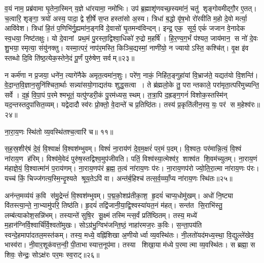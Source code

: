 व॒यं नाम॒ प्रब्र॑वामा घृ॒तेना॒स्मिन् य॒ज्ञे धा॑रयामा॒ नमो॑भिः। उप॑ ब्र॒ह्माशृ॑णवच्छ॒स्यमा॑नं॒ चतु॑ शृङ्गोवमीद्गौ॒र ए॒तत्। च॒त्वारि॒ शृङ्गा॒ त्रयो॑ अस्य॒ पादा॒ द्वे शी॒र्\mbox{}षे स॒प्त हस्ता॑सो अ॒स्य। त्रिधा॑ ब॒द्धो वृ॑ष॒भो रो॑रवीति म॒हो दे॒वो मर्त्या॒ आवि॑वेश। त्रिधा॑ हि॒तं प॒णिभि॑र्गु॒ह्यमा॑न॒ङ्गवि॑ दे॒वासो॑ घृ॒तमन्व॑विन्दन्। इन्द्र॒ एक॒ सूर्य॒ एकं॑ जजान वे॒नादेक स्व॒धया॒ निष्ट॑तक्षुः। यो दे॒वानां प्रथ॒मं पु॒रस्ता॒द्विश्वा॒धिको॑ रु॒द्रो म॒हर्\mbox{}षि॑। हि॒र॒ण्य॒ग॒र्भं प॑श्यत॒ जाय॑मान॒ स नो॑ दे॒वः  शु॒भया॒ स्मृत्या॒ संयु॑नक्तु। यस्मा॒त्परं॒ नाप॑र॒मस्ति॒ किञ्चि॒द्यस्मां॒ नाणी॑यो॒ न ज्यायोऽस्ति॒ कश्चि॑त्। वृ॒क्ष इ॑व स्तब्धो दि॒वि ति॑ष्ठ॒त्येक॒स्तेने॒दं पू॒र्णं पुरु॑षेण॒ सर्वम्॥२३॥

न कर्म॑णा न प्र॒जया॒ धने॑न॒ त्यागे॑नैके अमृत॒त्वमा॑न॒शुः। परे॑ण॒ नाकं॒ निहि॑त॒ङ्गुहा॑यां  वि॒भ्राज॑ते॒ यद्यत॑यो वि॒शन्ति॑। वे॒दा॒न्त॒वि॒ज्ञान॒सुनि॑श्चिता॒र्थाः सन्न्या॑सयो॒गाद्यत॑यः  शुद्ध॒सत्वा। ते ब्र॑ह्मलो॒के तु॒ परान्तकाले॒ परा॑मृता॒त्परि॑मुच्यन्ति॒ सर्वे। द॒ह्रं॒  वि॒पा॒पं प॒रमेश्मभूतं॒ यत्पु॑ण्डरी॒कं पु॒रम॑ध्यस॒स्थम्। त॒त्रा॒पि द॒ह्रङ्ग॒गनं॑  विशोक॒स्तस्मि॑न् यद॒न्तस्तदुपा॑सित॒व्यम्। यद्वेदादौ स्व॑रः प्रो॒क्तो॒ वे॒दान्ते॑ च प्र॒तिष्ठि॑तः। तस्य॑ प्र॒कृति॑लीन॒स्य॒ यः॒ पर॑ स म॒हेश्व॑रः॥२४॥

ना॒रा॒य॒णः स्थि॑तो व्य॒वस्थि॑तश्च॒त्वारि॑ च॥ ११॥
\anuvakamend


स॒ह॒स्र॒शीर्॑षं  दे॒वं॒  वि॒श्वाक्षं॑  वि॒श्वश॑म्भुवम्। विश्वं॑ ना॒राय॑णं दे॒व॒म॒क्षरं॑ पर॒मं प॒दम्। वि॒श्वतः॒ पर॑मान्नि॒त्यं॒  वि॒श्वं ना॑राय॒ण ह॑रिम्। विश्व॑मे॒वेदं पुरु॑ष॒स्तद्विश्व॒मुप॑जीवति। पतिं॒  विश्व॑स्या॒त्मेश्व॑र॒ शाश्व॑त शि॒वम॑च्युतम्। ना॒राय॒णं म॑हाज्ञे॒यं॒  वि॒श्वात्मा॑नं प॒राय॑णम्। ना॒राय॒णप॑रं ब्र॒ह्म॒ त॒त्वं ना॑राय॒णः प॑रः। ना॒राय॒णप॑रो ज्यो॒ति॒रा॒त्मा ना॑राय॒णः प॑रः। यच्च॑ किं॒ चिज्ज॑गत्य॒स्मि॒न्दृ॒श्यते श्रूय॒तेऽपि॑ वा। अन्त॑र्ब॒हिश्च॑ तत्स॒र्व॒व्व्याँ॒प्य ना॑राय॒णः स्थि॑तः॥२५॥

अन॑न्त॒मव्य॑यं क॒वि स॑मु॒द्रेन्तं॑  वि॒श्वश॑म्भुवम्। प॒द्म॒को॒शप्र॑तीका॒श॒ हृ॒दयं॑ चाप्य॒धोमु॑खम्। अधो॑ नि॒ष्ट्या वि॑तस्त्या॒न्ते॒ ना॒भ्यामु॑परि॒ तिष्ठ॑ति। हृ॒दयं॑ तद्वि॑जानी॒या॒द्वि॒श्वस्या॑यत॒नं म॑हत्। सन्त॑त सि॒राभि॑स्तु॒ लम्ब॑त्याकोश॒सन्नि॑भम्। तस्यान्ते॑ सुषि॒र सू॒क्ष्मं तस्मिन्त्स॒र्वं प्रति॑ष्ठितम्। तस्य॒ मध्ये॑ म॒हान॑ग्निर्वि॒श्वार्चि॑र्वि॒श्वतो॑मुखः। सोऽग्र॑भु॒ग्विभ॑जन्ति॒ष्ठं॒ नाहा॑रमज॒रः क॒विः। स॒न्ता॒पय॑ति स्वन्दे॒हमापा॑दतल॒मस्त॑कम्। तस्य॒ मध्ये॒ वह्नि॑शिखा अ॒णीयोर्ध्वा व्य॒वस्थि॑तः। नी॒लतो॑यद॑मध्य॒स्था॒ वि॒द्युल्ले॑खेव॒ भास्व॑रा। नी॒वार॒शूक॑वत्त॒न्वी॒ पी॒ताभास्यात्त॒नूप॑मा। तस्या  शिखा॒या म॑ध्ये प॒रमात्मा व्य॒वस्थि॑तः। स ब्रह्मा॒ स शिवः॒ सेन्द्रः॒ सोऽक्ष॑रः पर॒मः स्व॒राट्॥२६॥
\anuvakamend


